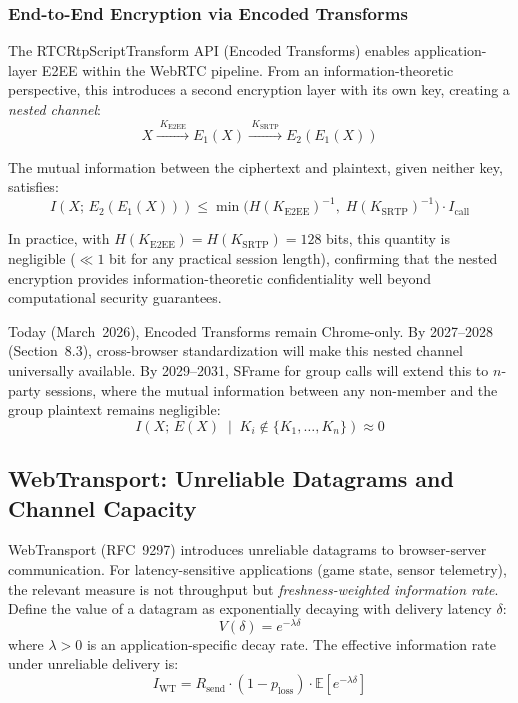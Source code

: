 \subsubsection{End-to-End Encryption via Encoded Transforms}

The RTCRtpScriptTransform API (Encoded Transforms) enables
application-layer E2EE within the WebRTC pipeline. From an
information-theoretic perspective, this introduces a second encryption
layer with its own key, creating a \emph{nested channel}:
\begin{equation}
  X \xrightarrow{\;K_{\text{E2EE}}\;}
  E_1(X) \xrightarrow{\;K_{\text{SRTP}}\;}
  E_2(E_1(X))
  \label{eq:nested}
\end{equation}

The mutual information between the ciphertext and plaintext, given
neither key, satisfies:
\begin{equation}
  I\!\left(X;\, E_2(E_1(X))\right) \leq
    \min\!\big(H(K_{\text{E2EE}})^{-1},\;
    H(K_{\text{SRTP}})^{-1}\big)
    \cdot I_{\text{call}}
  \label{eq:mutual-e2ee}
\end{equation}

In practice, with $H(K_{\text{E2EE}}) = H(K_{\text{SRTP}}) = 128$
bits, this quantity is negligible ($\ll 1$ bit for any practical
session length), confirming that the nested encryption provides
information-theoretic confidentiality well beyond computational
security guarantees.

Today (March~2026), Encoded Transforms remain Chrome-only. By
2027--2028 (Section~8.3), cross-browser standardization will make
this nested channel universally available. By 2029--2031, SFrame
for group calls will extend this to $n$-party sessions, where the
mutual information between any non-member and the group plaintext
remains negligible:
\begin{equation}
  I\!\left(X;\, E(X) \;\middle|\; K_i \notin
    \{K_1, \ldots, K_n\}\right) \approx 0
  \label{eq:sframe}
\end{equation}

\subsection{WebTransport: Unreliable Datagrams and Channel Capacity}

WebTransport (RFC~9297) introduces unreliable datagrams to browser-server
communication. For latency-sensitive applications (game state, sensor
telemetry), the relevant measure is not throughput but
\emph{freshness-weighted information rate}. Define the value of a
datagram as exponentially decaying with delivery latency $\delta$:
\begin{equation}
  V(\delta) = e^{-\lambda \delta}
  \label{eq:freshness}
\end{equation}
where $\lambda > 0$ is an application-specific decay rate. The
effective information rate under unreliable delivery is:
\begin{equation}
  I_{\text{WT}} = R_{\text{send}} \cdot (1 - p_{\text{loss}})
    \cdot \mathbb{E}\!\left[e^{-\lambda \delta}\right]
  \label{eq:iwt}
\end{equation}

